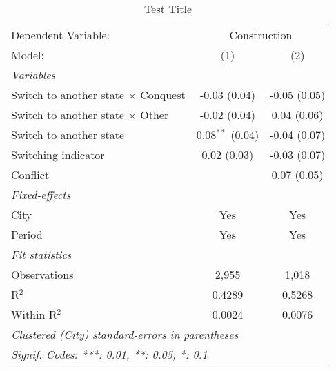 \begin{table}[htbp]
   \caption{\label{tab:baseline_100y} Test Title}
   \centering
   \begin{tabular}{lcc}
      \tabularnewline \midrule \midrule
      Dependent Variable: & \multicolumn{2}{c}{Construction}\\
      Model:                                     & (1)                & (2)\\  
      \midrule
      \emph{Variables}\\
      Switch to another state $\times$ Conquest  & -0.03 (0.04)       & -0.05 (0.05)\\   
      Switch to another state $\times$ Other     & -0.02 (0.04)       & 0.04 (0.06)\\   
      Switch to another state                    & 0.08$^{**}$ (0.04) & -0.04 (0.07)\\   
      Switching indicator                        & 0.02 (0.03)        & -0.03 (0.07)\\   
      Conflict                                   &                    & 0.07 (0.05)\\   
      \midrule
      \emph{Fixed-effects}\\
      City                                       & Yes                & Yes\\  
      Period                                     & Yes                & Yes\\  
      \midrule
      \emph{Fit statistics}\\
      Observations                               & 2,955              & 1,018\\  
      R$^2$                                      & 0.4289             & 0.5268\\  
      Within R$^2$                               & 0.0024             & 0.0076\\  
      \midrule \midrule
      \multicolumn{3}{l}{\emph{Clustered (City) standard-errors in parentheses}}\\
      \multicolumn{3}{l}{\emph{Signif. Codes: ***: 0.01, **: 0.05, *: 0.1}}\\
   \end{tabular}
\end{table}
